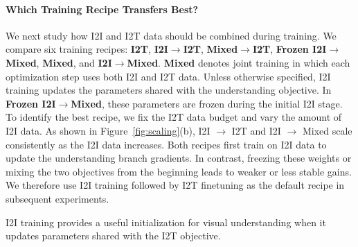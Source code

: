 \paragraph{Which Training Recipe Transfers Best?}
We next study how I2I and I2T data should be combined during training. 
We compare six training recipes: \textbf{I2T}, \textbf{I2I$\rightarrow$I2T}, \textbf{Mixed$\rightarrow$I2T}, \textbf{Frozen I2I$\rightarrow$Mixed}, \textbf{Mixed}, and \textbf{I2I$\rightarrow$Mixed}. 
\textbf{Mixed} denotes joint training in which each optimization step uses both I2I and I2T data. 
Unless otherwise specified, I2I training updates the parameters shared with the understanding objective. In \textbf{Frozen I2I$\rightarrow$Mixed}, these parameters are frozen during the initial I2I stage.
To identify the best recipe, we fix the I2T data budget and vary the amount of I2I data.
As shown in Figure~\ref{fig:scaling}(b), I2I $\rightarrow$ I2T and I2I $\rightarrow$ Mixed scale consistently as the I2I data increases.
Both recipes first train on I2I data to update the understanding branch gradients.
In contrast, freezing these weights or mixing the two objectives from the beginning leads to weaker or less stable gains.
We therefore use I2I training followed by I2T finetuning as the default recipe in subsequent experiments.
\begin{findingbox}
I2I training provides a useful initialization for visual understanding when it updates parameters shared with the I2T objective.
\end{findingbox}
